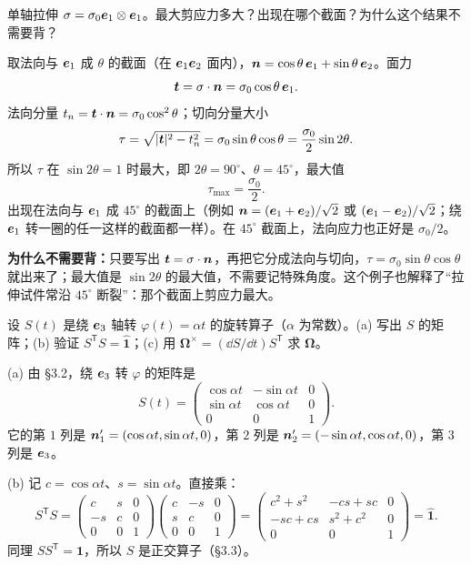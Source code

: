 \documentclass[11pt]{ctexart}
\newcommand{\ten}[1]{\mathbf{#1}}
\newcommand{\unitd}{\hat{\ten{1}}}
\begin{document}
{单轴拉伸 $\ten\sigma=\sigma_0\vect e_1\otimes\vect e_1$。最大剪应力多大？出现在哪个截面？为什么这个结果不需要背？}

取法向与 $\boldsymbol{e}_1$ 成 $\theta$ 的截面（在 $\boldsymbol{e}_1\boldsymbol{e}_2$ 面内），$\boldsymbol{n}=\cos\theta\,\boldsymbol{e}_1+\sin\theta\,\boldsymbol{e}_2$。面力
\[
\vect t=\ten\sigma\cdot\vect n=\sigma_0\cos\theta\,\vect e_1 .
\]
法向分量 $t_n=\boldsymbol{t}\cdot\boldsymbol{n}=\sigma_0\cos^2\theta$；切向分量大小
\[
\tau=\sqrt{|\boldsymbol{t}|^2-t_n^2}
=\sigma_0\sin\theta\cos\theta
=\frac{\sigma_0}{2}\sin2\theta .
\]
所以 $\tau$ 在 $\sin2\theta=1$ 时最大，即 $2\theta=90^\circ$、$\theta=45^\circ$，最大值
\[
\tau_{\max}=\frac{\sigma_0}{2}.
\]
出现在法向与 $\boldsymbol{e}_1$ 成 $45^\circ$ 的截面上（例如 $\boldsymbol{n}=(\boldsymbol{e}_1+\boldsymbol{e}_2)/\sqrt2$ 或 $(\boldsymbol{e}_1-\boldsymbol{e}_2)/\sqrt2$；绕 $\boldsymbol{e}_1$ 转一圈的任一这样的截面都一样）。在 $45^\circ$ 截面上，法向应力也正好是 $\sigma_0/2$。

\textbf{为什么不需要背：}只要写出 $\vect t=\ten\sigma\cdot\vect n$，再把它分成法向与切向，$\tau=\sigma_0\sin\theta\cos\theta$ 就出来了；最大值是 $\sin2\theta$ 的最大值，不需要记特殊角度。这个例子也解释了“拉伸试件常沿 $45^\circ$ 断裂”：那个截面上剪应力最大。

{设 $S(t)$ 是绕 $\boldsymbol{e}_3$ 轴转 $\varphi(t)=\alpha t$ 的旋转算子（$\alpha$ 为常数）。(a) 写出 $S$ 的矩阵；(b) 验证 $S^{\mathsf T}S=\unitd$；(c) 用 $\boldsymbol\Omega^{\times}=(\dd S/\dd t)S^{\mathsf T}$ 求 $\boldsymbol\Omega$。}

(a) 由 §3.2，绕 $\boldsymbol{e}_3$ 转 $\varphi$ 的矩阵是
\[
S(t)=
\begin{pmatrix}
\cos\alpha t&-\sin\alpha t&0\\
\sin\alpha t&\cos\alpha t&0\\
0&0&1
\end{pmatrix}.
\]
它的第 $1$ 列是 $\boldsymbol{n}'_1=(\cos\alpha t,\sin\alpha t,0)$，第 $2$ 列是 $\boldsymbol{n}'_2=(-\sin\alpha t,\cos\alpha t,0)$，第 $3$ 列是 $\boldsymbol{e}_3$。

(b) 记 $c=\cos\alpha t$、$s=\sin\alpha t$。直接乘：
\[
S^{\mathsf T}S=
\begin{pmatrix}
c&s&0\\-s&c&0\\0&0&1
\end{pmatrix}
\begin{pmatrix}
c&-s&0\\s&c&0\\0&0&1
\end{pmatrix}
=
\begin{pmatrix}
c^2+s^2&-cs+sc&0\\
-sc+cs&s^2+c^2&0\\
0&0&1
\end{pmatrix}
=\unitd .
\]
同理 $SS^{\mathsf T}=\unitd$，所以 $S$ 是正交算子（§3.3）。
\end{document}
